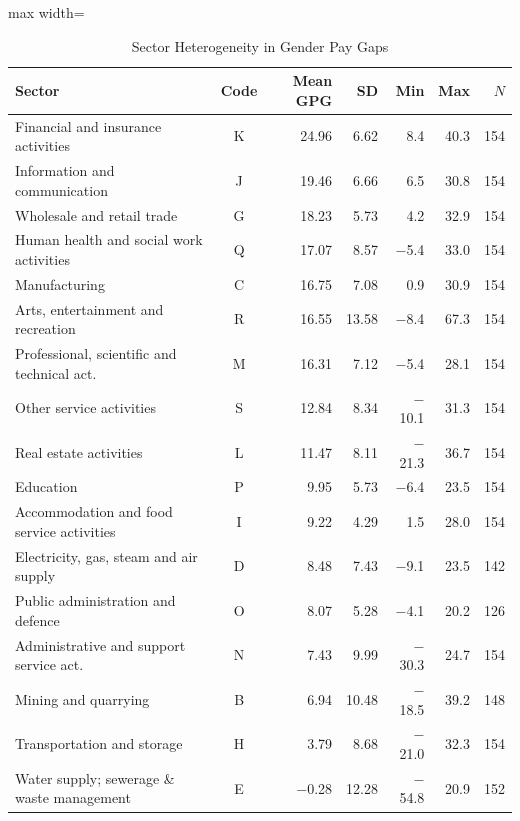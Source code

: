 \documentclass[12pt,a4paper]{article}
\begin{document}
\begin{table}[htbp]
\caption{Sector Heterogeneity in Gender Pay Gaps}
\label{tab:sector}
\begin{threeparttable}
\begin{adjustbox}{max width=\textwidth}
\begin{tabular}{p{8.5cm}crrrrr}
\toprule
Sector & Code & Mean GPG & SD & Min & Max & $N$ \\
\midrule
Financial and insurance activities         & K & 24.96 & 6.62 & 8.4 & 40.3 & 154 \\
Information and communication              & J & 19.46 & 6.66 & 6.5 & 30.8 & 154 \\
Wholesale and retail trade                 & G & 18.23 & 5.73 & 4.2 & 32.9 & 154 \\
Human health and social work activities    & Q & 17.07 & 8.57 & $-$5.4 & 33.0 & 154 \\
Manufacturing                              & C & 16.75 & 7.08 & 0.9 & 30.9 & 154 \\
Arts, entertainment and recreation         & R & 16.55 & 13.58 & $-$8.4 & 67.3 & 154 \\
Professional, scientific and technical act.\ & M & 16.31 & 7.12 & $-$5.4 & 28.1 & 154 \\
Other service activities                   & S & 12.84 & 8.34 & $-$10.1 & 31.3 & 154 \\
Real estate activities                     & L & 11.47 & 8.11 & $-$21.3 & 36.7 & 154 \\
Education                                  & P &  9.95 & 5.73 & $-$6.4 & 23.5 & 154 \\
Accommodation and food service activities  & I &  9.22 & 4.29 & 1.5 & 28.0 & 154 \\
Electricity, gas, steam and air supply     & D &  8.48 & 7.43 & $-$9.1 & 23.5 & 142 \\
Public administration and defence          & O &  8.07 & 5.28 & $-$4.1 & 20.2 & 126 \\
Administrative and support service act.\   & N &  7.43 & 9.99 & $-$30.3 & 24.7 & 154 \\
Mining and quarrying                       & B &  6.94 & 10.48 & $-$18.5 & 39.2 & 148 \\
Transportation and storage                 & H &  3.79 & 8.68 & $-$21.0 & 32.3 & 154 \\
Water supply; sewerage \& waste management & E & $-$0.28 & 12.28 & $-$54.8 & 20.9 & 152 \\

\end{tabular}
\end{adjustbox}
\end{threeparttable}
\end{table}
\end{document}
